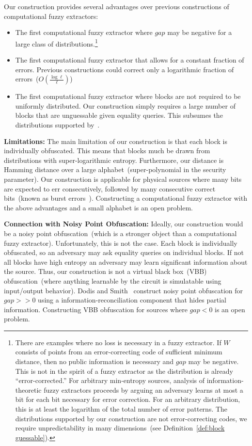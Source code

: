\documentclass[11pt]{article}
\newcommand{\defref}[1]{\mbox{Definition~\ref{#1}}}
\begin{document}
Our construction provides several advantages over previous constructions of computational fuzzy extractors:
\begin{itemize}
\item The first computational fuzzy extractor where $gap$ may be negative for a large class of distributions.\footnote{There are examples where no loss is necessary in a fuzzy extractor.  If $W$ consists of points from an error-correcting code of sufficient minimum distance, then no public information is necessary and $gap$ may be negative.  This is not in the spirit of a fuzzy extractor as the distribution is already ``error-corrected.''  For arbitrary min-entropy sources, analysis of information-theoretic fuzzy extractors proceeds by arguing an adversary learns at most a bit for each bit necessary for error correction.   For an arbitrary distribution, this is at least the logarithm of the total number of error patterns.  The distributions supported by our construction are not error-correcting codes, we require unpredictability in many dimensions~(see \defref{def:block guessable}).}
\item The first computational fuzzy extractor that allows for a constant fraction of errors.  Previous constructions could correct only  a logarithmic fraction of errors~($O(\frac{\log \ell}{\ell})$)
\item The first computational fuzzy extractor where blocks are not required to be uniformly distributed.  Our construction simply requires a large number of blocks that are unguessable given equality queries.  This subsumes the distributions supported by~\cite[Construction 4.1]{fuller2013computational}.
\end{itemize}

\textbf{Limitations: } The main limitation of our construction is that each block is individually obfuscated.  This means that blocks much be drawn from distributions with super-logarithmic entropy.  Furthermore, our distance is Hamming distance over a large alphabet~(super-polynomial in the security parameter).  Our construction is applicable for physical sources where many bits are expected to err consecutively, followed by many consecutive correct bits~(known as burst errors~\cite{gilbert1960capacity}).  Constructing a computational fuzzy extractor with the above advantages and a small alphabet is an open problem.


\textbf{Connection with Noisy Point Obfuscation: } Ideally, our construction would be a noisy point obfuscation~(which is a stronger object than a computational fuzzy extractor).  Unfortunately, this is not the case.  Each block is individually obfuscated, so an adversary may ask equality queries on individual blocks.  If not all blocks have high entropy an adversary may learn significant information about the source.  Thus, our construction is not a virtual black box~(VBB) obfuscation~(where anything learnable by the circuit is simulatable using input/output behavior).  Dodis and Smith~\cite{DBLP:conf/stoc/DodisS05} construct noisy point obfuscation for $gap>>0$ using a information-reconciliation component that hides partial information.  Constructing VBB obfuscation for sources where $gap <0$ is an open problem.
\end{document}
